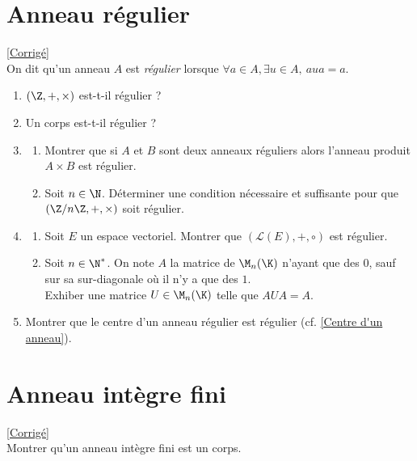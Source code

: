 \documentclass[8pt]{book}
\begin{document}
	\section{Anneau régulier }
	\label{Anneau régulier}
	\textcolor{blue}{\hyperref[Anneau régulier corrigé]{[Corrigé]}}\\
	On dit qu'un anneau $A$ est \textit{régulier} lorsque $\forall a\in A,\exists u\in A,\ aua=a$.
	\begin{enumerate}
		\item $(\Z,+,\times)$ est-t-il régulier ?
		\item Un corps est-t-il régulier ?
		\item \begin{enumerate}[label=\alph*.]
			\item Montrer que si $A$ et $B$ sont deux anneaux réguliers alors l'anneau produit $A\times B$ est régulier.
			\item Soit $n\in \N$. Déterminer une condition nécessaire et suffisante pour que $(\Z/n\Z,+,\times)$ soit régulier.
		\end{enumerate}
		\item \begin{enumerate}[label=\alph*.]
			\item Soit $E$ un espace vectoriel. Montrer que $(\mathcal L(E),+,\circ)$ est régulier.
			\item Soit $n\in \N^*$. On note $A$ la matrice de $\M_n(\K)$ n'ayant que des $0$, sauf sur sa sur-diagonale où il n'y a que des $1$.\\
			Exhiber une matrice $U\in \M_n(\K)$ telle que $AUA=A$.
		\end{enumerate}
		\item Montrer que le centre d'un anneau régulier est régulier (cf. \ref{Centre d'un anneau}).
	\end{enumerate}
	
	\section{Anneau intègre fini }
	\label{Anneau intègre fini}
	\textcolor{blue}{\hyperref[Anneau intègre fini corrigé]{[Corrigé]}}\\
	Montrer qu'un anneau intègre fini est un corps.
	
\end{document}
